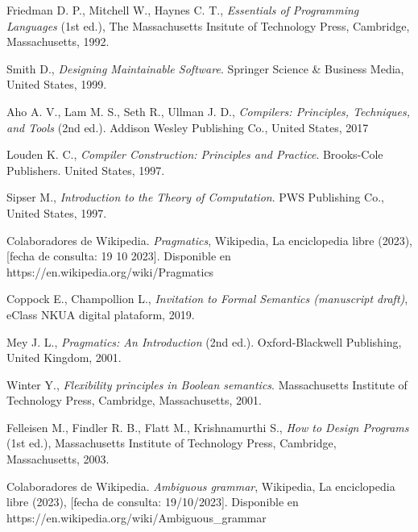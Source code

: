 \begin{thebibliography}{11}
    \bibitem{}
    \label{sec:30}
    \hypertarget{30}{}
    Friedman D. P., Mitchell W., Haynes C. T., \textit{Essentials of Programming Languages} (1st ed.), The Massachusetts Insitute of Technology Press, Cambridge, Massachusetts, 1992.

    \bibitem{}
    \label{sec:31}
    \hypertarget{31}{}
    Smith D., \textit{Designing Maintainable Software}. Springer Science \& Business Media, United States, 1999.

    \bibitem{}
    \label{sec:32}
    \hypertarget{32}{}
    Aho A. V., Lam M. S., Seth R., Ullman J. D.,  \textit{Compilers: Principles, Techniques, and Tools} (2nd ed.). Addison Wesley Publishing Co., United States, 2017

    \bibitem{}
    \label{sec:33}
    \hypertarget{33}{}
    Louden K. C., \textit{Compiler Construction: Principles and Practice}. Brooks-Cole Publishers. United States, 1997. %

    \bibitem{}
    \label{sec:34}
    \hypertarget{34}{}
    Sipser M., \textit{Introduction to the Theory of Computation}. PWS Publishing Co., United States, 1997.%

    \bibitem{}
    \label{sec:35}
    \hypertarget{35}{}
    Colaboradores de Wikipedia. \textit{Pragmatics}, Wikipedia, La enciclopedia libre (2023), [fecha de consulta: 19 10 2023]. Disponible en https://en.wikipedia.org/wiki/Pragmatics

    \bibitem{}
    \label{sec:36}
    \hypertarget{36}{}
    Coppock E., Champollion L., \textit{Invitation to Formal Semantics (manuscript draft)}, eClass NKUA digital plataform, 2019.%

    \bibitem{}
    \label{sec:37}
    \hypertarget{37}{}
    Mey J. L., \textit{Pragmatics: An Introduction} (2nd ed.). Oxford-Blackwell Publishing, United Kingdom, 2001.

    \bibitem{}
    \label{sec:38}
    \hypertarget{38}{}
    Winter Y., \textit{Flexibility principles in Boolean semantics}. Massachusetts Institute of Technology Press, Cambridge, Massachusetts, 2001.

    \bibitem{}
    \label{sec:39}
    \hypertarget{39}{}
    Felleisen M., Findler R. B., Flatt M., Krishnamurthi S., \textit{How to Design Programs} (1st ed.),   Massachusetts Institute of Technology Press, Cambridge, Massachusetts, 2003.

    \bibitem{}
    \label{sec:40}
    \hypertarget{40}{}
    Colaboradores de Wikipedia. \textit{Ambiguous grammar}, Wikipedia, La enciclopedia libre (2023), [fecha de consulta: 19/10/2023]. Disponible en https://en.wikipedia.org/wiki/Ambiguous\_grammar


\end{thebibliography}

